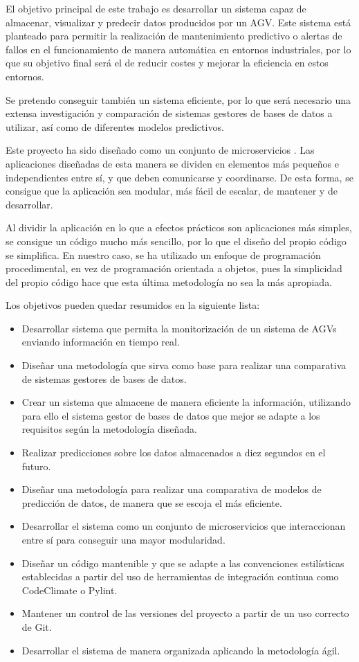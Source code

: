 
El objetivo principal de este trabajo es desarrollar un sistema capaz de almacenar, visualizar y predecir 
datos producidos por un AGV. Este sistema está planteado para permitir la realización de mantenimiento 
predictivo o alertas de fallos en el funcionamiento de manera automática en entornos industriales, 
por lo que su objetivo final será el de reducir costes y mejorar la eficiencia en estos entornos.

Se pretendo conseguir también un sistema eficiente, por lo que será necesario una extensa investigación 
y comparación de sistemas gestores de bases de datos a utilizar, así como de diferentes modelos predictivos.

Este proyecto ha sido diseñado como un conjunto de microservicios \cite{7030212}. Las aplicaciones diseñadas de esta manera se dividen 
en elementos más pequeños e independientes entre sí, y que deben comunicarse y coordinarse. De esta 
forma, se consigue que la aplicación sea modular, más fácil de escalar, de mantener y de desarrollar.

Al dividir la aplicación en lo que a efectos prácticos son aplicaciones más simples, se consigue un código 
mucho más sencillo, por lo que el diseño del propio código se simplifica. En nuestro caso, se ha utilizado 
un enfoque de programación procedimental, en vez de programación orientada a objetos, pues la simplicidad del propio 
código hace que esta última metodología no sea la más apropiada.

Los objetivos pueden quedar resumidos en la siguiente lista:
\begin{itemize}
    \item Desarrollar sistema que permita la monitorización de un sistema de AGVs enviando información en tiempo real.
    \item Diseñar una metodología que sirva como base para realizar una comparativa de sistemas gestores de bases de datos.
    \item Crear un sistema que almacene de manera eficiente la información, utilizando para ello el sistema gestor de bases 
        de datos que mejor se adapte a los requisitos según la metodología diseñada.
    \item Realizar predicciones sobre los datos almacenados a diez segundos en el futuro.
    \item Diseñar una metodología para realizar una comparativa de modelos de predicción de datos, de manera que se escoja el 
        más eficiente.
    \item Desarrollar el sistema como un conjunto de microservicios que interaccionan entre sí para conseguir una
        mayor modularidad.
    \item Diseñar un código mantenible y que se adapte a las convenciones estilísticas establecidas a partir del uso de
        herramientas de integración continua como CodeClimate o Pylint.
    \item Mantener un control de las versiones del proyecto a partir de un uso correcto de Git.
    \item Desarrollar el sistema de manera organizada aplicando la metodología ágil.
\end{itemize}
